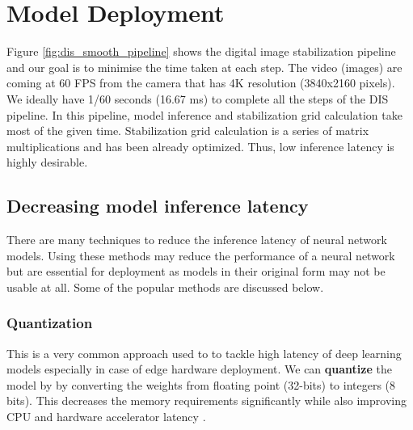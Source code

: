 







\section{Model Deployment}
Figure \ref{fig:dis_smooth_pipeline} shows the digital image stabilization pipeline and our goal is to minimise the time taken at each step. The video (images) are coming at 60 FPS from the camera that has 4K resolution (3840x2160 pixels). We ideally have 1/60 seconds (16.67 ms) to complete all the steps of the DIS pipeline. In this pipeline, model inference and stabilization grid calculation take most of the given time. Stabilization grid calculation is a series of matrix multiplications and has been already optimized. Thus, low inference latency is highly desirable.

\subsection{Decreasing model inference latency}
There are many techniques to reduce the inference latency of neural network models. Using these methods may reduce the performance of a neural network but are essential for deployment as models in their original form may not be usable at all. Some of the popular methods are discussed below.

\subsubsection{Quantization}
This is a very common approach used to to tackle high latency of deep learning models especially in case of edge hardware deployment. We can \textbf{quantize} the model by by converting the weights from floating point (32-bits) to integers (8 bits). This decreases the memory requirements significantly while also improving CPU and hardware accelerator latency \citep{FastModels}. 

